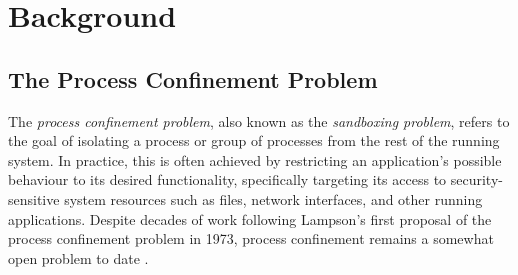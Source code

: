 \section{Background}

\subsection{The Process Confinement Problem}

The \textit{process confinement problem}, also known as the \textit{sandboxing
problem}, refers to the goal of isolating a process or group of processes from
the rest of the running system. In practice, this is often achieved by
restricting an application's possible behaviour to its desired functionality,
specifically targeting its access to security-sensitive system resources such as
files, network interfaces, and other running applications.
Despite decades of work following Lampson's \cite{lampson1973_a_note} first
proposal of the process confinement problem in 1973, process confinement remains
a somewhat open problem to date \cite{crowell2013_confinement_problem}.


